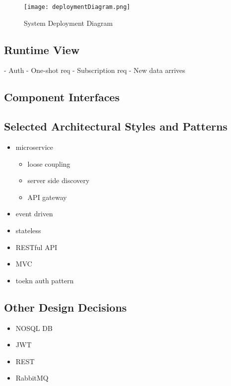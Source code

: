 \FloatBarrier
\begin{figure}[!h]
	\centering
	\texttt{[image: deploymentDiagram.png]}
	\caption{System Deployment Diagram}
\end{figure}
\FloatBarrier

\subsection{Runtime View}
- Auth
- One-shot req
- Subscription req
- New data arrives

\subsection{Component Interfaces}

\subsection{Selected Architectural Styles and Patterns}
\begin{itemize}
	\item microservice
	\begin{itemize}
		\item loose coupling
		\item server side discovery
		\item API gateway
	\end{itemize}
	\item event driven
	\item stateless
	\item RESTful API
	\item MVC
	\item toekn auth pattern
\end{itemize}


\subsection{Other Design Decisions}
\begin{itemize}
	\item  NOSQL DB
	\item  JWT
	\item  REST
	\item  RabbitMQ
\end{itemize}